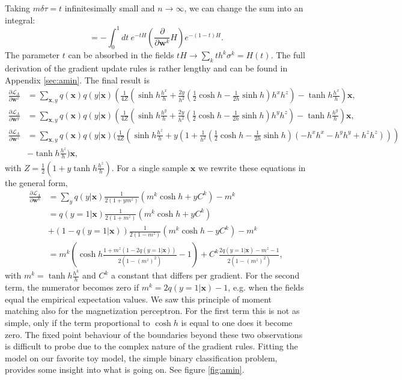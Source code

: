 Taking $m\delta\tau = t$ infinitesimally small and $n\rightarrow\infty$, we can change the sum into an integral:
\begin{equation*}
    = -\int_{0}^1 dt\: e^{-t H} (\frac{\partial }{\partial \mathbf{w}^k} H)e^{-(1-t) H}.
\end{equation*}
The parameter $t$ can be absorbed in the fields $t H \rightarrow \sum_k t h^k \sigma^k = H(t)$. The full derivation of the gradient update rules is rather lengthy and can be found in Appendix \ref{sec:amin}. The final result is
\begin{align*}
    \frac{\partial \mathcal{L}_{\Lambda}}{\partial \mathbf{w}^x}&= \sum_{\mathbf{x},y}  q(\mathbf{x})q(y | \mathbf{x}) \left(\frac{1}{4Z} \left(\sinh{h}\frac{h^x}{h} + \frac{2y}{h^2}\left( \frac{1}{2}\cosh{h} - \frac{1}{2h}\sinh{h} \right)h^xh^z \right) - \tanh{h}\frac{h^x}{h}\right)\mathbf{x},\\
    \frac{\partial \mathcal{L}_{\Lambda}}{\partial \mathbf{w}^y}&= \sum_{\mathbf{x},y}  q(\mathbf{x})q(y | \mathbf{x}) \left(\frac{1}{4Z}  \left(\sinh{h}\frac{h^y}{h} + \frac{2y}{h^2}\left(  \frac{1}{2}\cosh{h} - \frac{1}{2h}\sinh{h} \right)h^yh^z \right) - \tanh{h}\frac{h^y}{h}\right)\mathbf{x},\\
    \frac{\partial \mathcal{L}_{\Lambda}}{\partial \mathbf{w}^z} &= \sum_{\mathbf{x},y}  q(\mathbf{x})q(y | \mathbf{x})\bigg(\frac{1}{4Z} \left(\sinh{h}\frac{h^z}{h} + y\left(1 + \frac{1}{h^2}\left(  \frac{1}{2}\cosh{h} - \frac{1}{2h}\sinh{h} \right)(-h^x h^x - h^y h^y + h^z h^z)\right)\right)\\ 
    &- \tanh{h}\frac{h^z}{h}\bigg)\mathbf{x},
\end{align*}
with  $Z = \frac{1}{2}(1 + y \tanh{h}\frac{h^z}{h})$. For a single sample $\mathbf{x}$ we rewrite these equations in the general form,
\begin{align*}
    \frac{\partial \mathcal{L}_{\Lambda}}{\partial \mathbf{w}^k}&= \sum_{y} q(y | \mathbf{x}) \frac{1}{2(1 + y m^z)} \left(m^k \cosh{h} + y C^k\right) - m^k\\
    & = q(y=1 | \mathbf{x}) \frac{1}{2(1 + m^z)} \left( m^k \cosh{h} + y C^k\right) \\
    &+ (1-q(y=1| \mathbf{x})) \frac{1}{2(1 - m^z)} \left(m^k\cosh{h} - y C^k\right) - m^k\\
    & = m^k  \left(\cosh{h} \frac{1 + m^z(1-2q(y=1 | \mathbf{x}))}{2(1-(m^z)^2)} -1 \right) +  C^k \frac{2q(y=1 | \mathbf{x})-m^z-1}{2(1-(m^z)^2)},
\end{align*}
with $m^k = \tanh{h}\frac{h^k}{h}$ and $C^k$ a constant that differs per gradient. For the second term, the numerator becomes zero if $m^k = 2q(y=1 | \mathbf{x})-1$, e.g. when the fields equal the empirical expectation values. We saw this principle of moment matching also for the magnetization perceptron. For the first term this is not as simple, only if the term proportional to $\cosh{h}$ is equal to one does it become zero. The fixed point behaviour of the boundaries beyond these two observations is difficult to probe due to the complex nature of the gradient rules. Fitting the model on our favorite toy model, the simple binary classification problem, provides some insight into what is going on. See figure \ref{fig:amin}.\newline

